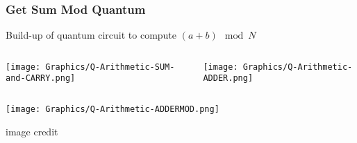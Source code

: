 
\begin{frame}
  \frametitle{Get Sum Mod Quantum}
  Build-up of quantum circuit to compute $(a+b) \mod N$
  \begin{columns}
    \texttt{[image: Graphics/Q-Arithmetic-SUM-and-CARRY.png]}

    \texttt{[image: Graphics/Q-Arithmetic-ADDER.png]}
  \end{columns}
  
  \texttt{[image: Graphics/Q-Arithmetic-ADDERMOD.png]}

  image credit~\cite{arXiv:9511018}
\end{frame}
